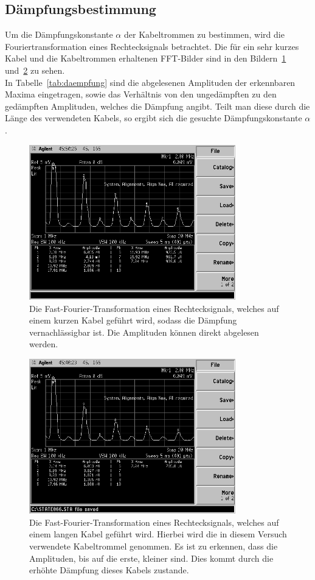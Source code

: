 \subsection{Dämpfungsbestimmung}
%
Um die Dämpfungskonstante $\alpha$ der Kabeltrommen zu bestimmen, 
wird die Fouriertransformation eines Rechtecksignals betrachtet. Die 
für ein sehr kurzes Kabel und die Kabeltrommen erhaltenen FFT-Bilder 
sind in den Bildern~\ref{fig:daempfung_kurz} 
und~\ref{fig:daempfung_lang} zu sehen.\\
In Tabelle~\ref{tab:daempfung} sind die abgelesenen Amplituden der 
erkennbaren Maxima eingetragen, sowie das Verhältnis von den 
ungedämpften zu den gedämpften Amplituden, welches die 
Dämpfung angibt. Teilt man diese durch die Länge des verwendeten 
Kabels, so ergibt sich die gesuchte Dämpfungskonstante $\alpha$.
%
\begin{figure}[]
\centering
\includegraphics[width=0.8\textwidth]{daempfung_kurz.png}
\caption{Die Fast-Fourier-Transformation eines Rechtecksignals, 
welches auf einem kurzen Kabel geführt wird, sodass die 
Dämpfung vernachlässigbar ist. Die Amplituden können direkt abgelesen 
werden.}
\label{fig:daempfung_kurz}
\end{figure}
%
\begin{figure}[]
\centering
\includegraphics[width=0.8\textwidth]{daempfung_lang.png}
\caption{Die Fast-Fourier-Transformation eines Rechtecksignals, 
welches auf einem langen Kabel geführt wird. Hierbei wird die 
in diesem Versuch verwendete Kabeltrommel genommen. 
Es ist zu erkennen, dass die Amplituden, bis auf die erste, kleiner 
sind. Dies kommt durch die erhöhte Dämpfung dieses Kabels 
zustande.}
\label{fig:daempfung_lang}
\end{figure}
